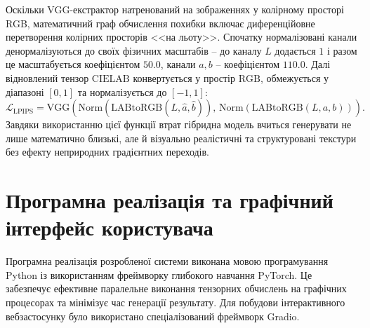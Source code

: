 \begin{enumerate}
                Оскільки VGG-екстрактор натренований на зображеннях у колірному просторі RGB, математичний граф обчислення похибки включає диференційовне перетворення колірних просторів <<на льоту>>.
                Спочатку нормалізовані канали денормалізуються до своїх фізичних масштабів -- до каналу $L$ додається $1$ і разом це масштабується коефіцієнтом $50.0$, канали $a, b$ -- коефіцієнтом $110.0$.
                Далі відновлений тензор $\mathrm{CIELAB}$ конвертується у простір $\mathrm{RGB}$, обмежується у діапазоні $[0, 1]$ та нормалізується до $[-1, 1]$:
                \begin{equation*}
                    \mathcal{L}_{\mathrm{LPIPS}} = \mathrm{VGG}\left( \mathrm{Norm}(\mathrm{LABtoRGB}(L, \hat{a}, \hat{b})), \, \mathrm{Norm}(\mathrm{LABtoRGB}(L, a, b)) \right).
                \end{equation*}
                Завдяки використанню цієї функції втрат гібридна модель вчиться генерувати не лише математично близькі, але й візуально реалістичні та структуровані текстури без ефекту неприродних градієнтних переходів.
            \end{enumerate}


    \section{Програмна реалізація та графічний інтерфейс користувача}
        Програмна реалізація розробленої системи виконана мовою програмування Python із використанням фреймворку глибокого навчання PyTorch.
        Це забезпечує ефективне паралельне виконання тензорних обчислень на графічних процесорах та мінімізує час генерації результату.
        Для побудови інтерактивного вебзастосунку було використано спеціалізований фреймворк Gradio.

